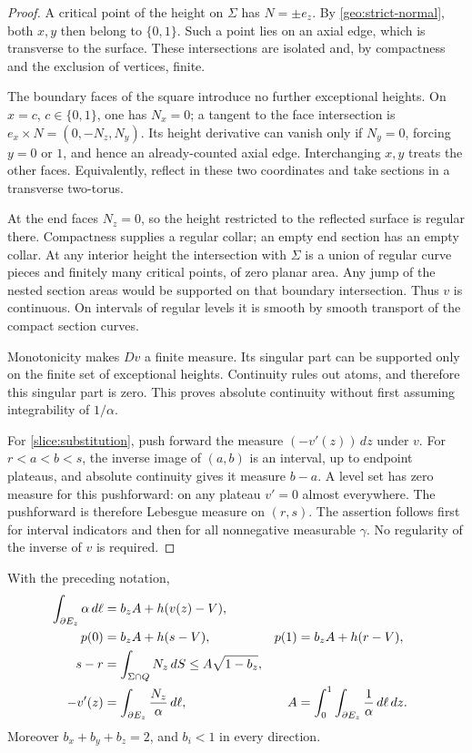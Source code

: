 \begin{proof}
A critical point of the height on \(\Sigma\) has \(N=\pm e_z\).
By \eqref{geo:strict-normal}, both \(x,y\) then belong to \(\{0,1\}\).
Such a point lies on an axial edge, which is transverse to the surface.
These intersections are isolated and, by compactness and the exclusion
of vertices, finite.

The boundary faces of the square introduce no further exceptional
heights. On \(x=c\), \(c\in\{0,1\}\), one has \(N_x=0\);
a tangent to the face intersection is
\(e_x\times N=(0,-N_z,N_y)\).
Its height derivative can vanish only if \(N_y=0\), forcing \(y=0\)
or \(1\), and hence an already-counted axial edge. Interchanging
\(x,y\) treats the other faces. Equivalently, reflect in these two
coordinates and take sections in a transverse two-torus.

At the end faces \(N_z=0\), so the height restricted to the reflected
surface is regular there. Compactness supplies a regular collar;
an empty end section has an empty collar.
At any interior height the intersection with \(\Sigma\) is a union
of regular curve pieces and finitely many critical points, of zero
planar area. Any jump of the nested section areas would be supported
on that boundary intersection. Thus \(v\) is continuous. On intervals
of regular levels it is smooth by smooth transport of the compact
section curves.

Monotonicity makes \(Dv\) a finite measure. Its singular part can be
supported only on the finite set of exceptional heights. Continuity
rules out atoms, and therefore this singular part is zero.
This proves absolute continuity without first assuming integrability
of \(1/\alpha\).

For \eqref{slice:substitution}, push forward the measure
\((-v'(z))\,dz\) under \(v\). For \(r<a<b<s\), the inverse image of
\((a,b)\) is an interval, up to endpoint plateaus, and absolute
continuity gives it measure \(b-a\). A level set has zero measure for
this pushforward: on any plateau \(v'=0\) almost everywhere.
The pushforward is therefore Lebesgue measure on \((r,s)\).
The assertion follows first for interval indicators and then for all
nonnegative measurable \(\gamma\). No regularity of the inverse of
\(v\) is required.
\end{proof}

\begin{lemma}\label{slice:identities}
With the preceding notation,
\begin{align}
 \int_{\partial E_z}\alpha\,d\ell
     &=b_z A+h(v(z)-V),\notag\\
 p(0)&=b_zA+h(s-V),&
 p(1)&=b_zA+h(r-V),
 \label{slice:flux}\\
 s-r&=\int_{\Sigma\cap Q}N_z\,dS
       \le A\sqrt{1-b_z},
 \label{slice:projection}\\
 -v'(z)&=\int_{\partial E_z}\frac{N_z}{\alpha}\,d\ell,&
 A&=\int_0^1\int_{\partial E_z}\frac1\alpha\,d\ell\,dz.
 \label{slice:coarea}
\end{align}
Moreover \(b_x+b_y+b_z=2\), and \(b_i<1\) in every direction.
\end{lemma}

